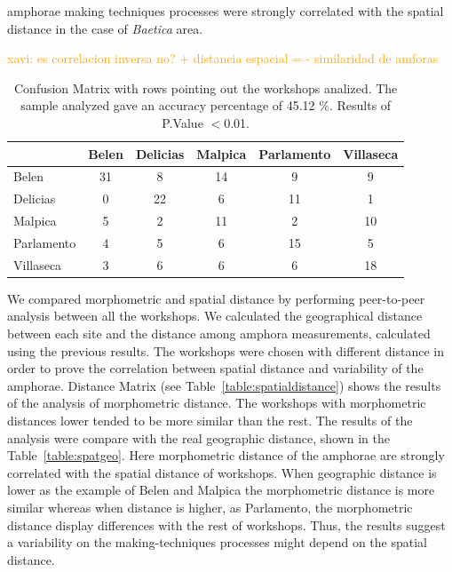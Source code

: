 \documentclass[review]{elsarticle}
\newcommand{\memo}[2]{\textcolor{#1}{#2}}
\newcommand{\xavi}[1]{\memo{orange}{xavi: #1\\}}
\begin{document}
amphorae making techniques processes were strongly correlated with the spatial distance in the case of \textit{Baetica} area. 


\xavi{es correlacion inversa no? + distancia espacial = - similaridad de amforas}

\begin{table}[htp]
\begin{tabular}{lccccc}
\hline
 & Belen & Delicias & Malpica & Parlamento & Villaseca\\ \hline
Belen & 31 &       8 &      14 &          9 &          9 \\
Delicias       & 0 &        22 &       6&         11&         1 \\
Malpica &       5  &     2  &    11   &       2  &      10 \\
Parlamento &     4  &      5 &      6 &        15 &        5\\
Villaseca   &   3   &     6   &    6  &        6  &     18 \\
\hline

\end{tabular}
\caption{Confusion Matrix with rows pointing out the workshops analized. The sample analyzed gave an accuracy percentage of 45.12 $\%$. Results of P.Value $<$0.01. }
\label{table:confusion}
\end{table}


We compared morphometric and spatial distance by performing peer-to-peer analysis between all the workshops. We calculated the geographical distance between each site and the distance among amphora measurements, calculated using the previous results. The workshops were chosen with different distance in order to prove the correlation between spatial distance and variability of the amphorae. Distance Matrix (see Table~\ref{table:spatialdistance}) shows the results of the analysis of morphometric distance. The workshops with morphometric distances lower tended to be more similar than the rest. The results of the analysis were compare with the real geographic distance, shown in the Table~\ref{table:spatgeo}. Here morphometric distance of the amphorae are strongly correlated with the spatial distance of workshops. When geographic distance is lower as the example of Belen and Malpica the morphometric distance is more similar whereas when distance is higher, as Parlamento, the morphometric distance display differences with the rest of workshops. Thus, the results suggest a variability on the making-techniques processes might depend on the spatial distance.  
\end{document}
